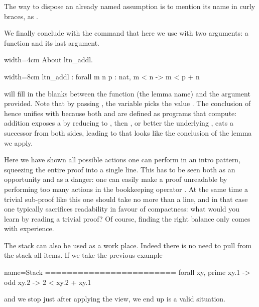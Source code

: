 The way to dispose an already named assumption is to mention
its name in curly braces, as .

We finally conclude with the  command that here we use
with two arguments: a function and its last argument.

\begin{coq}{}{width=4cm}
About ltn_addl.
\end{coq}
\begin{coqout}{}{width=8cm}
ltn_addl : forall m n p : nat, m < n -> m < p + n
\end{coqout}

 will fill in the blanks between the function (the lemma name)
and the argument provided.  Note that by passing , the
variable  picks the value .  The conclusion of 
hence unifies with  because both \C{+} and \C{<} are
defined as programs that compute: addition exposes a  by
reducing to , then \C{<}, or better the underlying
\C{<=}, eats a successor from both sides, leading to 
that looks like the conclusion of the lemma we apply.

Here we have shown all possible actions one can perform in an intro
pattern, squeezing the entire proof into a single line.  This has
to be seen both as an opportunity and as a danger: one can easily
make a proof unreadable by performing too many actions in the bookkeeping
operator \C{=>}.  At the same time a trivial sub-proof like this one
should take no more than a line, and in that case one typically
sacrifices readability in favour of compactness: what would you learn by
reading a trivial proof?  Of course,
finding the right balance only comes with experience.




The stack can also be used as a work place.  Indeed there is
no need to pull from the stack all items.  If we take the previous example

\begin{coqout}{name=Stack}{}
========================
forall xy, prime xy.1 -> odd xy.2 -> 2 < xy.2 + xy.1
\end{coqout}
and we stop just after applying the view, we end up is a valid situation.

